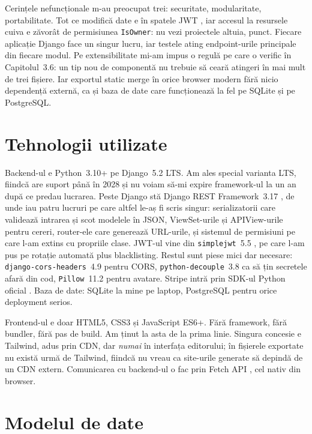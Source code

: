 \documentclass[12pt,a4paper]{report}
\begin{document}
Cerințele nefuncționale m-au preocupat trei: securitate, modularitate,
portabilitate. Tot ce modifică date e în spatele JWT \cite{rfc7519}, iar accesul la
resursele cuiva e zăvorât de permisiunea \texttt{IsOwner}: nu vezi proiectele
altuia, punct. Fiecare aplicație Django face un singur lucru, iar testele ating
endpoint-urile principale din fiecare modul. Pe extensibilitate mi-am impus o regulă
pe care o verific în Capitolul~3.6: un tip nou de componentă nu trebuie să ceară
atingeri în mai mult de trei fișiere. Iar exportul static merge în orice browser
modern fără nicio dependență externă, ca și baza de date care funcționează la fel
pe SQLite și pe PostgreSQL.

\section{Tehnologii utilizate}

Backend-ul e Python~3.10+ pe Django~5.2 LTS. Am ales special varianta LTS,
fiindcă are suport până în 2028 \cite{djangodocs} și nu voiam să-mi expire framework-ul
la un an după ce predau lucrarea. Peste Django stă Django REST Framework~3.17
\cite{drfdocs}, de unde iau patru lucruri pe care altfel le-aș fi scris singur:
serializatorii care validează intrarea și scot modelele în JSON, ViewSet-urile și
APIView-urile pentru cereri, router-ele care generează URL-urile, și sistemul de
permisiuni pe care l-am extins cu propriile clase. JWT-ul vine din
\texttt{simplejwt}~5.5 \cite{simplejwt}, pe care l-am pus pe rotație automată plus
blacklisting. Restul sunt piese mici dar necesare: \texttt{django-cors-headers}~4.9
pentru CORS, \texttt{python-decouple}~3.8 ca să țin secretele afară din cod,
\texttt{Pillow}~11.2 pentru avatare. Stripe intră prin SDK-ul Python oficial
\cite{stripedocs}. Baza de date: SQLite \cite{sqlitedocs} la mine pe laptop,
PostgreSQL \cite{postgresqldocs} pentru orice deployment serios.

Frontend-ul e doar HTML5, CSS3 și JavaScript ES6+. Fără framework, fără bundler,
fără pas de build. Am ținut la asta de la prima linie. Singura concesie e Tailwind,
adus prin CDN, dar \emph{numai} în interfața editorului; în fișierele exportate nu
există urmă de Tailwind, fiindcă nu vreau ca site-urile generate să depindă de un CDN
extern. Comunicarea cu backend-ul o fac prin Fetch API \cite{mdnFetch}, cel nativ din
browser.

\section{Modelul de date}
\end{document}
